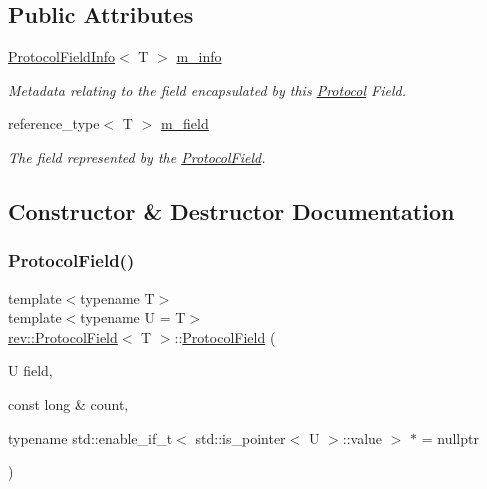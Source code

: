 \subsection*{Public Attributes}
\begin{DoxyCompactItemize}
\item 
\mbox{\label{structrev_1_1_protocol_field_ac97f716faa6c9f39728735cf2835e98a}} 
\mbox{\hyperlink{structrev_1_1_protocol_field_info}{Protocol\+Field\+Info}}$<$ T $>$ \mbox{\hyperlink{structrev_1_1_protocol_field_ac97f716faa6c9f39728735cf2835e98a}{m\+\_\+info}}
\begin{DoxyCompactList}\small\item\em Metadata relating to the field encapsulated by this \mbox{\hyperlink{classrev_1_1_protocol}{Protocol}} Field. \end{DoxyCompactList}\item 
\mbox{\label{structrev_1_1_protocol_field_a70b18ac77914282a626cbbf7693493c7}} 
reference\+\_\+type$<$ T $>$ \mbox{\hyperlink{structrev_1_1_protocol_field_a70b18ac77914282a626cbbf7693493c7}{m\+\_\+field}}
\begin{DoxyCompactList}\small\item\em The field represented by the \mbox{\hyperlink{structrev_1_1_protocol_field}{Protocol\+Field}}. \end{DoxyCompactList}\end{DoxyCompactItemize}


\subsection{Constructor \& Destructor Documentation}
\mbox{\label{structrev_1_1_protocol_field_a06790796f00e203909e4134eb9a9a0a4}} 
\subsubsection{\texorpdfstring{ProtocolField()}{ProtocolField()}}
{\footnotesize\ttfamily template$<$typename T$>$ \\
template$<$typename U  = T$>$ \\
\mbox{\hyperlink{structrev_1_1_protocol_field}{rev\+::\+Protocol\+Field}}$<$ T $>$\+::\mbox{\hyperlink{structrev_1_1_protocol_field}{Protocol\+Field}} (\begin{DoxyParamCaption}\item[{U}]{field,  }\item[{const long \&}]{count,  }\item[{typename std\+::enable\+\_\+if\+\_\+t$<$ std\+::is\+\_\+pointer$<$ U $>$\+::value $>$ $\ast$}]{ = {\ttfamily nullptr} }\end{DoxyParamCaption})\hspace{0.3cm}{\ttfamily [inline]}}



